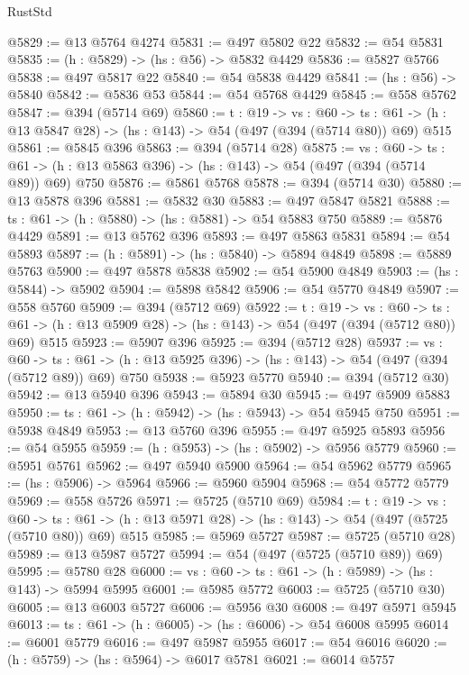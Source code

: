 \begin{lexlean}{RustStd}
\begin{coremodule}
@5829 := @13 @5764 @4274
@5831 := @497 @5802 @22
@5832 := @54 @5831
@5835 := (h : @5829) -> (hs : @56) -> @5832 @4429
@5836 := @5827 @5766
@5838 := @497 @5817 @22
@5840 := @54 @5838 @4429
@5841 := (hs : @56) -> @5840
@5842 := @5836 @53
@5844 := @54 @5768 @4429
@5845 := @558 @5762
@5847 := @394 (@5714 @69)
@5860 := {t : @19} ->
  {vs : @60} ->
  {ts : @61} -> (h : @13 @5847 @28) -> (hs : @143) -> @54 (@497 (@394 (@5714 @80)) @69) @515
@5861 := @5845 @396
@5863 := @394 (@5714 @28)
@5875 := {vs : @60} ->
  {ts : @61} -> (h : @13 @5863 @396) -> (hs : @143) -> @54 (@497 (@394 (@5714 @89)) @69) @750
@5876 := @5861 @5768
@5878 := @394 (@5714 @30)
@5880 := @13 @5878 @396
@5881 := @5832 @30
@5883 := @497 @5847 @5821
@5888 := {ts : @61} -> (h : @5880) -> (hs : @5881) -> @54 @5883 @750
@5889 := @5876 @4429
@5891 := @13 @5762 @396
@5893 := @497 @5863 @5831
@5894 := @54 @5893
@5897 := (h : @5891) -> (hs : @5840) -> @5894 @4849
@5898 := @5889 @5763
@5900 := @497 @5878 @5838
@5902 := @54 @5900 @4849
@5903 := (hs : @5844) -> @5902
@5904 := @5898 @5842
@5906 := @54 @5770 @4849
@5907 := @558 @5760
@5909 := @394 (@5712 @69)
@5922 := {t : @19} ->
  {vs : @60} ->
  {ts : @61} -> (h : @13 @5909 @28) -> (hs : @143) -> @54 (@497 (@394 (@5712 @80)) @69) @515
@5923 := @5907 @396
@5925 := @394 (@5712 @28)
@5937 := {vs : @60} ->
  {ts : @61} -> (h : @13 @5925 @396) -> (hs : @143) -> @54 (@497 (@394 (@5712 @89)) @69) @750
@5938 := @5923 @5770
@5940 := @394 (@5712 @30)
@5942 := @13 @5940 @396
@5943 := @5894 @30
@5945 := @497 @5909 @5883
@5950 := {ts : @61} -> (h : @5942) -> (hs : @5943) -> @54 @5945 @750
@5951 := @5938 @4849
@5953 := @13 @5760 @396
@5955 := @497 @5925 @5893
@5956 := @54 @5955
@5959 := (h : @5953) -> (hs : @5902) -> @5956 @5779
@5960 := @5951 @5761
@5962 := @497 @5940 @5900
@5964 := @54 @5962 @5779
@5965 := (hs : @5906) -> @5964
@5966 := @5960 @5904
@5968 := @54 @5772 @5779
@5969 := @558 @5726
@5971 := @5725 (@5710 @69)
@5984 := {t : @19} ->
  {vs : @60} ->
  {ts : @61} -> (h : @13 @5971 @28) -> (hs : @143) -> @54 (@497 (@5725 (@5710 @80)) @69) @515
@5985 := @5969 @5727
@5987 := @5725 (@5710 @28)
@5989 := @13 @5987 @5727
@5994 := @54 (@497 (@5725 (@5710 @89)) @69)
@5995 := @5780 @28
@6000 := {vs : @60} -> {ts : @61} -> (h : @5989) -> (hs : @143) -> @5994 @5995
@6001 := @5985 @5772
@6003 := @5725 (@5710 @30)
@6005 := @13 @6003 @5727
@6006 := @5956 @30
@6008 := @497 @5971 @5945
@6013 := {ts : @61} -> (h : @6005) -> (hs : @6006) -> @54 @6008 @5995
@6014 := @6001 @5779
@6016 := @497 @5987 @5955
@6017 := @54 @6016
@6020 := (h : @5759) -> (hs : @5964) -> @6017 @5781
@6021 := @6014 @5757

\end{coremodule}
\end{lexlean}
